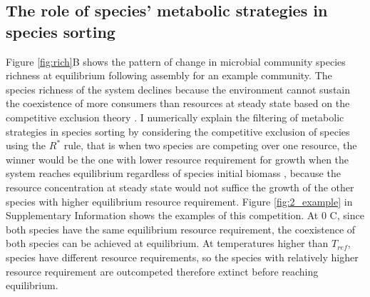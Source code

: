 \documentclass[11pt, a4paper]{article}
\begin{document}
\begin{spacing}{1.5}
\subsection{The role of species' metabolic strategies in species sorting}

Figure \ref{fig:rich}B shows the pattern of change in microbial community species richness at equilibrium following assembly for an example community. The species richness of the system declines because the environment cannot sustain the coexistence of more consumers than resources at steady state based on the competitive exclusion theory \citep{hardin1960competitive, levin1970community}. I numerically explain the filtering of metabolic strategies in species sorting by considering the competitive exclusion of species using the $R^*$ rule, that is when two species are competing over one resource, the winner would be the one with lower resource requirement for growth when the system reaches equilibrium regardless of species initial biomass \citep{tilman1982resource}, because the resource concentration at steady state would not suffice the growth of the other species with higher equilibrium resource requirement. Figure \ref{fig:2_example} in Supplementary Information shows the examples of this competition. At 0 \textdegree C, since both species have the same equilibrium resource requirement, the coexistence of both species can be achieved at equilibrium. At temperatures higher than $T_{ref}$, species have different resource requirements, so the species with relatively higher resource requirement are outcompeted therefore extinct before reaching equilibrium. 


\end{spacing}
\end{document}
